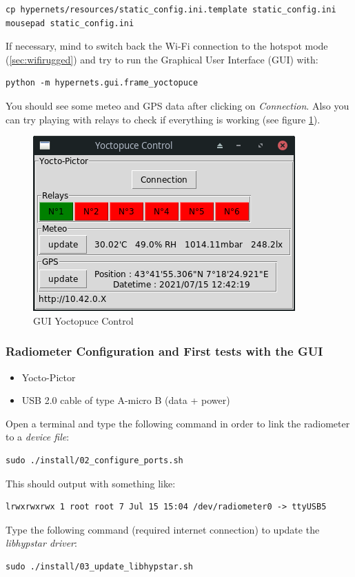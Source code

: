 \begin{lstlisting}
cp hypernets/resources/static_config.ini.template static_config.ini
mousepad static_config.ini
\end{lstlisting}


If necessary, mind to switch back the Wi-Fi connection to the hotspot mode
(\ref{sec:wifirugged}) and try to run the Graphical User Interface (GUI) with: 

\begin{lstlisting}
python -m hypernets.gui.frame_yoctopuce
\end{lstlisting}

You should see some meteo and GPS data after clicking on \emph{Connection}. 
Also you can try playing with relays to check if everything is working 
(see figure \ref{gui_yocto}).


\begin{figure}[!ht]
	\centering
	\includegraphics[scale=.55]{images/gui_yocto.png}
	\caption{GUI Yoctopuce Control}
	\label{gui_yocto}
\end{figure}


\subsubsection{Radiometer Configuration and First tests with the GUI}
\begin{itemize}
	\item Yocto-Pictor
	\item USB 2.0 cable of type A-micro B (data + power) 
\end{itemize}

Open a terminal and type the following command in order to link the radiometer
to a \textit{device file}:
\begin{lstlisting}
sudo ./install/02_configure_ports.sh
\end{lstlisting}
This should output with something like:
\begin{lstlisting}
lrwxrwxrwx 1 root root 7 Jul 15 15:04 /dev/radiometer0 -> ttyUSB5
\end{lstlisting}
Type the following command (required internet connection) to update the
\textit{libhypstar driver}:
\begin{lstlisting}
sudo ./install/03_update_libhypstar.sh
\end{lstlisting}

